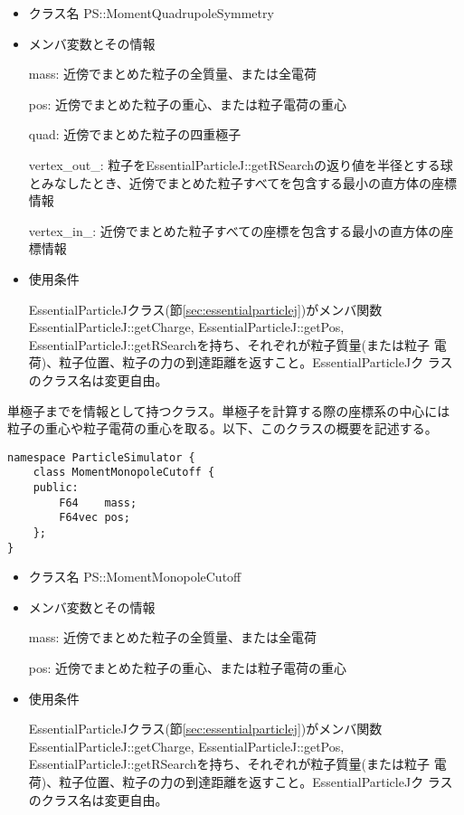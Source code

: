 \begin{itemize}
\item クラス名
  PS::MomentQuadrupoleSymmetry

\item メンバ変数とその情報

  mass: 近傍でまとめた粒子の全質量、または全電荷

  pos: 近傍でまとめた粒子の重心、または粒子電荷の重心
  
  quad: 近傍でまとめた粒子の四重極子
  
  vertex\_out\_: 粒子をEssentialParticleJ::getRSearchの返り値を半径とする球とみなしたとき、近傍でまとめた粒子すべてを包含する最小の直方体の座標情報
  
  vertex\_in\_: 近傍でまとめた粒子すべての座標を包含する最小の直方体の座標情報

\item 使用条件

  EssentialParticleJクラス(節\ref{sec:essentialparticlej})がメンバ関数
  EssentialParticleJ::getCharge, EssentialParticleJ::getPos,
  EssentialParticleJ::getRSearchを持ち、それぞれが粒子質量(または粒子
  電荷)、粒子位置、粒子の力の到達距離を返すこと。EssentialParticleJク
  ラスのクラス名は変更自由。

\end{itemize}



\label{sec:MomentMonopoleCutoff}

単極子までを情報として持つクラス。単極子を計算する際の座標系の中心には
粒子の重心や粒子電荷の重心を取る。以下、このクラスの概要を記述する。
\begin{screen}
\begin{verbatim}
namespace ParticleSimulator {
    class MomentMonopoleCutoff {
    public:
        F64    mass;
        F64vec pos;
    };
}
\end{verbatim}
\end{screen}

\begin{itemize}
\item クラス名
  PS::MomentMonopoleCutoff

\item メンバ変数とその情報

  mass: 近傍でまとめた粒子の全質量、または全電荷

  pos: 近傍でまとめた粒子の重心、または粒子電荷の重心

\item 使用条件

  EssentialParticleJクラス(節\ref{sec:essentialparticlej})がメンバ関数
  EssentialParticleJ::getCharge, EssentialParticleJ::getPos,
  EssentialParticleJ::getRSearchを持ち、それぞれが粒子質量(または粒子
  電荷)、粒子位置、粒子の力の到達距離を返すこと。EssentialParticleJク
  ラスのクラス名は変更自由。

\end{itemize}
  

